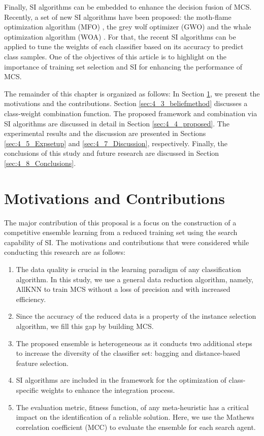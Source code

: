 Finally, SI algorithms can be embedded to enhance the decision fusion of MCS. Recently, a set of new SI algorithms have been proposed: the moth-flame optimization algorithm (MFO) \cite{mirjalili2015a}, the grey wolf optimizer (GWO) \cite{mirjalili2014} and the whale optimization algorithm (WOA) \cite{mirjalili2016}. For that, the recent SI algorithms can be applied to tune the weights of each classifier based on its accuracy to predict class samples. One of the objectives of this article is to highlight on the importance of training set selection and SI for enhancing the performance of MCS.


The remainder of this chapter is organized as follows: In Section \ref{sec:4_2_motivation}, we present the motivations and the contributions. Section \ref{sec:4_3_beliefmethod} discusses a class-weight combination function. The proposed framework and combination via SI algorithms are discussed in detail in Section \ref{sec:4_4_proposed}. The  experimental results and the discussion are presented in Sections \ref{sec:4_5_Expsetup} and \ref{sec:4_7_Discussion}, respectively. Finally, the conclusions of this study and future research are discussed in Section \ref{sec:4_8_Conclusions}. 


\section{Motivations and Contributions} \label{sec:4_2_motivation}
 
The major contribution of this proposal is a focus on the construction of a competitive ensemble learning from a reduced training set using the search capability of SI. The motivations and contributions that were considered while conducting this research are as follows:
\begin{enumerate}[nosep]
  \item The data quality is crucial in the learning paradigm of any classification algorithm. In this study, we use a general data reduction algorithm, namely, AllKNN \cite{tomek1976} to train MCS without a loss of precision and with increased efficiency.  
 \item Since the accuracy of the reduced data is a property of the instance selection algorithm, we fill this gap by building MCS.       
  \item The proposed ensemble is heterogeneous as it conducts two additional steps to increase the diversity of the classifier set: bagging \cite{breiman1996} and distance-based feature selection. 
 \item SI algorithms are included in the framework for the optimization of class-specific weights to enhance the integration process.
  \item The evaluation metric, fitness function, of any meta-heuristic has a critical impact on the identification of a reliable solution. Here, we use the Mathews correlation coefficient (MCC) \cite{matthews1975,jurman2012} to evaluate the ensemble for each search agent.
  \end{enumerate} 
  
